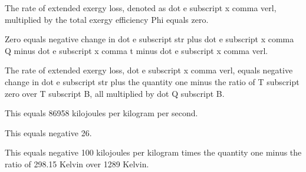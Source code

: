 The rate of extended exergy loss, denoted as dot e subscript x comma verl, multiplied by the total exergy efficiency Phi equals zero.

Zero equals negative change in dot e subscript str plus dot e subscript x comma Q minus dot e subscript x comma t minus dot e subscript x comma verl.

The rate of extended exergy loss, dot e subscript x comma verl, equals negative change in dot e subscript str plus the quantity one minus the ratio of T subscript zero over T subscript B, all multiplied by dot Q subscript B.

This equals 86958 kilojoules per kilogram per second.

This equals negative 26.

This equals negative 100 kilojoules per kilogram times the quantity one minus the ratio of 298.15 Kelvin over 1289 Kelvin.